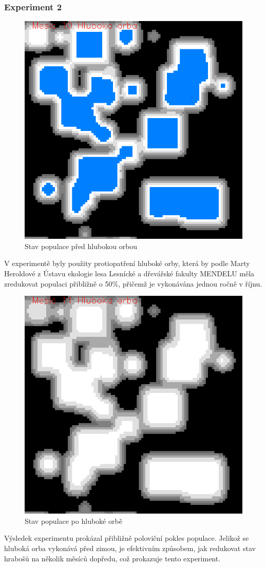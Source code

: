 \documentclass[a4paper,11pt]{article}
\begin{document}
\subsubsection{Experiment 2}
\begin{figure}[h]
\begin{center}
    \includegraphics[width=.4\linewidth]{hlub_orba10.png}
    \caption{Stav populace před hlubokou orbou}
    \label{exp2_obr1}
\end{center}
\end{figure}

V experimentě byly použity protiopatření hluboké orby, která by podle Marty Heroldové z Ústavu ekologie lesa Lesnícké a dřevářské fakulty MENDELU měla zredukovat populaci přibližně o 50\%, přičemž je vykonávána jednou ročně v říjnu. 

\begin{figure}[h]
\begin{center}
    \includegraphics[width=.4\linewidth]{hlub_orba11.png}
    \caption{Stav populace po hluboké orbě}
    \label{exp2_obr2}
\end{center}
\end{figure}

Výsledek experimentu prokázal přibližně poloviční pokles populace. Jelikož se hluboká orba vykonává před zimou, je efektivním způsobem, jak redukovat stav hrabošů na několik měsíců dopředu, což prokazuje tento experiment.
\newpage
\end{document}
